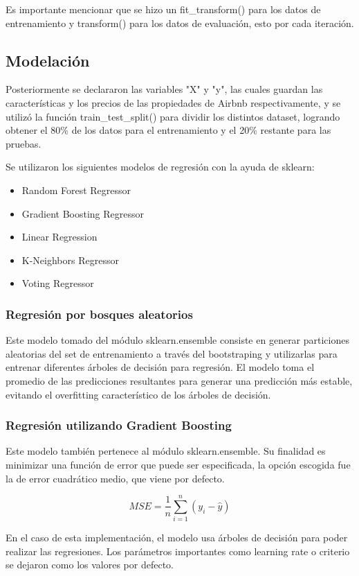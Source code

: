 \documentclass[sigconf,authorversion,nonacm]{acmart}
\begin{document}
Es importante mencionar que se hizo un fit\_transform() para los datos de entrenamiento y transform() para los datos de evaluación, esto por cada iteración.  


\subsection{Modelación}
Posteriormente se declararon las variables "X" y "y", las cuales guardan las características y los precios de las propiedades de Airbnb respectivamente, y se utilizó la función train\_test\_split() para dividir los distintos dataset, logrando obtener el 80\% de los datos para el entrenamiento y el 20\% restante para las pruebas.

Se utilizaron los siguientes modelos de regresión con la ayuda de sklearn\cite{scikit-learn}:
\begin{itemize}
  \item Random Forest Regressor
  \item Gradient Boosting Regressor
  \item Linear Regression
  \item K-Neighbors Regressor
  \item Voting Regressor
\end{itemize}

\subsubsection{Regresión por bosques aleatorios}
Este modelo tomado del módulo sklearn.ensemble consiste en generar particiones aleatorias del set de entrenamiento a través del bootstraping y utilizarlas para entrenar diferentes árboles de decisión para regresión. El modelo toma el promedio de las predicciones resultantes para generar una predicción más estable, evitando el overfitting característico de los árboles de decisión.

\subsubsection{Regresión utilizando Gradient Boosting}
Este modelo también pertenece al módulo sklearn.ensemble.
Su finalidad es minimizar una función de error que puede ser especificada\cite{draper1998applied}, la opción escogida fue la de error cuadrático medio, que viene por defecto.

$$MSE = \frac{1}{n} \sum_{i=1}^{n} (y_i - \hat{y})$$

En el caso de esta implementación, el modelo usa árboles de decisión para poder realizar las regresiones.
Los parámetros importantes como learning rate o criterio se dejaron como los valores por defecto.
\end{document}
